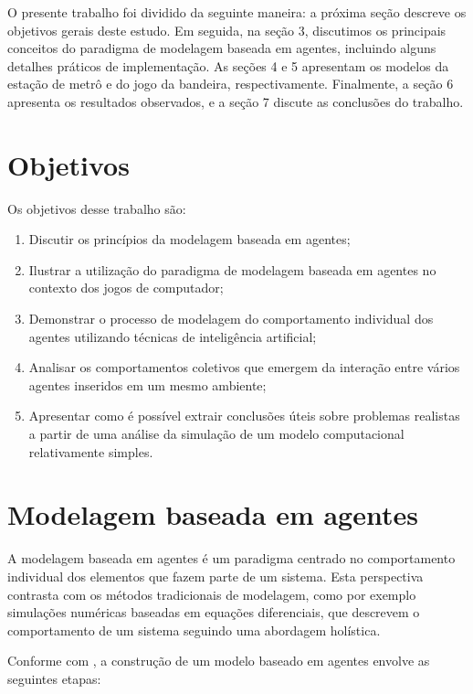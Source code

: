 \documentclass[preprint,12pt]{elsarticle}
\begin{document}
O presente trabalho foi dividido da seguinte maneira: a próxima seção descreve os objetivos gerais deste estudo. Em seguida, na seção 3, discutimos os principais conceitos do paradigma de modelagem baseada em agentes, incluindo alguns detalhes práticos de implementação. As seções 4 e 5 apresentam os modelos da estação de metrô e do jogo da bandeira, respectivamente. Finalmente, a seção 6 apresenta os resultados observados, e a seção 7 discute as conclusões do trabalho.

\section{Objetivos}
\label{sec:objetivos}

Os objetivos desse trabalho são:

\begin{enumerate}
	\item Discutir os princípios da modelagem baseada em agentes;
	\item Ilustrar a utilização do paradigma de modelagem baseada em agentes no contexto dos jogos de computador;
	\item Demonstrar o processo de modelagem do comportamento individual dos agentes utilizando técnicas de inteligência artificial;
	\item Analisar os comportamentos coletivos que emergem da interação entre vários agentes inseridos em um mesmo ambiente;
	\item Apresentar como é possível extrair conclusões úteis sobre problemas realistas a partir de uma análise da simulação de um modelo computacional relativamente simples.
\end{enumerate}

\newpage

\section{Modelagem baseada em agentes}
\label{sec:experimentos}

A modelagem baseada em agentes é um paradigma centrado no comportamento individual dos elementos que fazem parte de um sistema. Esta perspectiva contrasta com os métodos tradicionais de modelagem, como por exemplo simulações numéricas baseadas em equações diferenciais, que descrevem o comportamento de um sistema seguindo uma abordagem holística.

Conforme com \citet{macal2005tutorial}, a construção de um modelo baseado em agentes envolve as seguintes etapas:
\end{document}
